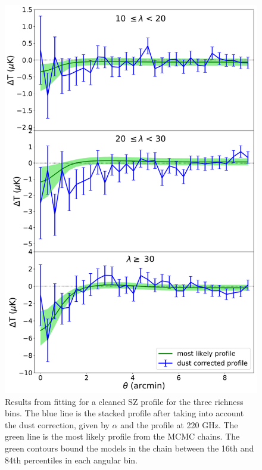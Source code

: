 \documentclass[a4paper,fleqn,usenatbib]{mnras}
\begin{document}
\begin{figure}
  \centering
  \includegraphics[width=0.5 \textwidth]{MLprof_ncut_all.pdf}
  \caption{Results from fitting for a cleaned SZ profile for the three richness bins. The blue line is the stacked profile after taking into account the dust correction, given by $\alpha$ and the profile at 220 GHz. The green line is the most likely profile from the MCMC chains. The green contours bound the models in the chain between the 16th and 84th percentiles in each angular bin.}
  \label{fig:mcmcprof}
\end{figure}
\end{document}
